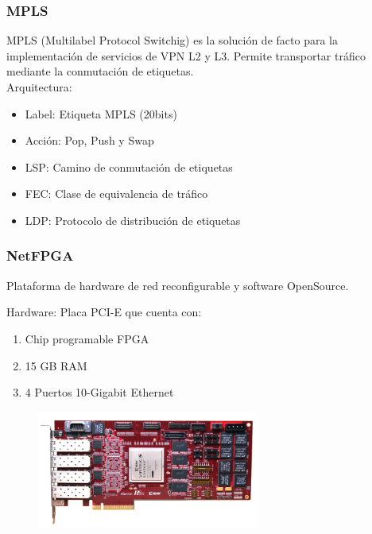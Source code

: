 \documentclass{beamer}
\begin{document}
\begin{frame}
\frametitle{MPLS} 

MPLS (Multilabel Protocol Switchig) es la soluci\'on de facto para la implementaci\'on de servicios de VPN L2 y L3. Permite transportar tr\'afico mediante la conmutaci\'on de etiquetas.\\

\vspace{0.4cm}
\pause
Arquitectura:\\

\begin{itemize}
\item Label: Etiqueta MPLS (20bits)
\item Acci\'on: Pop, Push y Swap
\item LSP: Camino de conmutaci\'on de etiquetas
\item FEC: Clase de equivalencia de tr\'afico
\item LDP: Protocolo de distribución de etiquetas
\end{itemize}

\end{frame}


\begin{frame}
\frametitle{NetFPGA} 


	Plataforma de hardware de red reconfigurable y software OpenSource.



		Hardware: Placa PCI-E que cuenta con: 
		\begin{enumerate}
			\item Chip programable FPGA 
			\item 15 GB RAM
			\item 4 Puertos 10-Gigabit Ethernet
		\end{enumerate}
		
	\begin{figure}[H]
		\includegraphics[width=0.65\textwidth, right]{imagenes/NetFPGA10G_web.jpg}
	\end{figure}


\end{frame}
\end{document}
